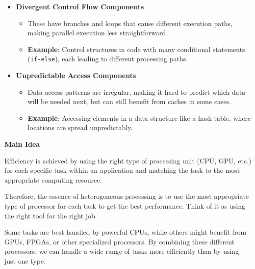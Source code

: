 \begin{itemize}
    \item \textbf{Divergent Control Flow Components}
    \begin{itemize}
        \item These have branches and loops that cause different execution paths, making parallel execution less straightforward.
        \item \textcolor{Green3}{\textbf{Example}}: Control structures in code with many conditional statements (\texttt{if-else}), each leading to different processing paths.
    \end{itemize}
 
    \item \textbf{Unpredictable Access Components}
    \begin{itemize}
        \item Data access patterns are irregular, making it hard to predict which data will be needed next, but can still benefit from caches in some cases.
        \item \textcolor{Green3}{\textbf{Example}}: Accessing elements in a data structure like a hash table, where locations are spread unpredictably.
    \end{itemize}
\end{itemize}

\newpage

\begin{flushleft}
    \textcolor{Green3}{ \textbf{Main Idea}}
\end{flushleft}
Efficiency is achieved by using the right type of processing unit (CPU, GPU, etc.) for each specific task within an application and matching the task to the most appropriate computing resource.

\highspace
Therefore, the essence of heterogeneous processing is to use the most appropriate type of processor for each task to get the best performance. Think of it as using the right tool for the right job.

\highspace
Some tasks are best handled by powerful CPUs, while others might benefit from GPUs, FPGAs, or other specialized processors. By combining these different processors, we can handle a wide range of tasks more efficiently than by using just one type.
